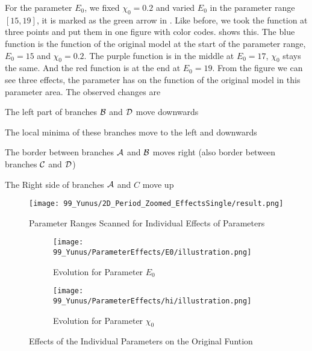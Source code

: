 For the parameter $E_0$, we fixed $\chi_0 = 0.2$ and varied $E_0$ in the parameter range $[15, 19]$, it is marked as the green arrow in .
Like before, we took the function at three points and put them in one figure with color codes.
 shows this.
The blue function is the function of the original model at the start of the parameter range, $E_0 = 15$ and $\chi_0 = 0.2$.
The purple function is in the middle at $E_0 = 17$, $\chi_0$ stays the same.
And the red function is at the end at $E_0 = 19$.
From the figure we can see three effects, the parameter has on the function of the original model in this parameter area.
The observed changes are
\begin{enumerate*}
    \item The left part of branches $\mathcal{B}$ and $\mathcal{D}$ move downwards
    \item The local minima of these branches move to the left and downwards
    \item The border between branches $\mathcal{A}$ and $\mathcal{B}$ moves right (also border between branches $\mathcal{C}$ and $\mathcal{D}$)
    \item The Right side of branches $\mathcal{A}$ and $C$ move up 
\end{enumerate*}

\begin{figure}
    \centering
    \texttt{[image: 99\_Yunus/2D\_Period\_Zoomed\_EffectsSingle/result.png]}
    \label{fig:yunus.function.evolution.single.map}
    \caption{Parameter Ranges Scanned for Individual Effects of Parameters}
\end{figure}

\begin{figure}
    \centering
    \begin{subfigure}{0.4\textwidth}
        \texttt{[image: 99\_Yunus/ParameterEffects/E0/illustration.png]}
        \caption{Evolution for Parameter $E_0$}
        \label{fig:yunus.function.evolution.e0}
    \end{subfigure}
    \begin{subfigure}{0.4\textwidth}
        \texttt{[image: 99\_Yunus/ParameterEffects/hi/illustration.png]}
        \caption{Evolution for Parameter $\chi_0$}
        \label{fig:yunus.function.evolution.hi}
    \end{subfigure}
    \caption{Effects of the Individual Parameters on the Original Funtion}
\end{figure}
